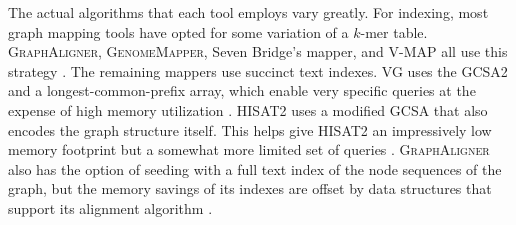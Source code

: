The actual algorithms that each tool employs vary greatly. 
For indexing, most graph mapping tools have opted for some variation of a $k$-mer table. 
\textsc{GraphAligner}, \textsc{GenomeMapper}, Seven Bridge's mapper, and \textsc{V-MAP} all use this strategy \cite{Rautiainen_2019b, Schneeberger_2009, Rakocevic_2019, Vaddadi_2019}. 
The remaining mappers use succinct text indexes.
\textsc{VG} uses the GCSA2 \cite{Siren_2017} and a longest-common-prefix array, which enable very specific queries at the expense of high memory utilization \cite{Garrison_2019}.
\textsc{HISAT2} uses a modified GCSA \cite{Siren_2014} that also encodes the graph structure itself.
This helps give \textsc{HISAT2} an impressively low memory footprint but a somewhat more limited set of queries \cite{Kim_2019}.
\textsc{GraphAligner} also has the option of seeding with a full text index of the node sequences of the graph, but the memory savings of its indexes are offset by data structures that support its alignment algorithm \cite{Rautiainen_2019b}.



